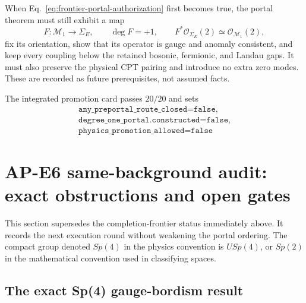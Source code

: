 \documentclass[11pt]{article}
\numberwithin{equation}{section}
\begin{document}
When Eq.~\eqref{eq:frontier-portal-authorization} first becomes true, the
portal theorem must still exhibit a map
\begin{equation}
 F:\mathcal M_1\longrightarrow\Sigma_E,\qquad
 \deg F=+1,\qquad
 F^*\mathcal O_{\Sigma_E}(2)\simeq\mathcal O_{\mathcal M_1}(2),
 \label{eq:frontier-degree-one}
\end{equation}
fix its orientation, show that its operator is gauge and anomaly consistent,
and keep every coupling below the retained bosonic, fermionic, and Landau
gaps.  It must also preserve the physical CPT pairing and introduce no
extra zero modes.  These are recorded as future prerequisites, not assumed
facts.

The integrated promotion card
 passes \(20/20\) and
sets
\begin{equation}
 \boxed{\begin{gathered}
 \texttt{any\_preportal\_route\_closed=false},\\
 \texttt{degree\_one\_portal.constructed=false},\\
 \texttt{physics\_promotion\_allowed=false}
 \end{gathered}}
 \label{eq:frontier-final-status}
\end{equation}

\section{AP-E6 same-background audit: exact obstructions and open gates}
\label{sec:ap-e6-same-background}

This section supersedes the completion-frontier status immediately above.
It records the next execution round without weakening the portal ordering.
The compact group denoted \(Sp(4)\) in the physics convention is
\(USp(4)\), or \(Sp(2)\) in the mathematical convention used in classifying
spaces.

\subsection{The exact Sp(4) gauge-bordism result}
\end{document}

